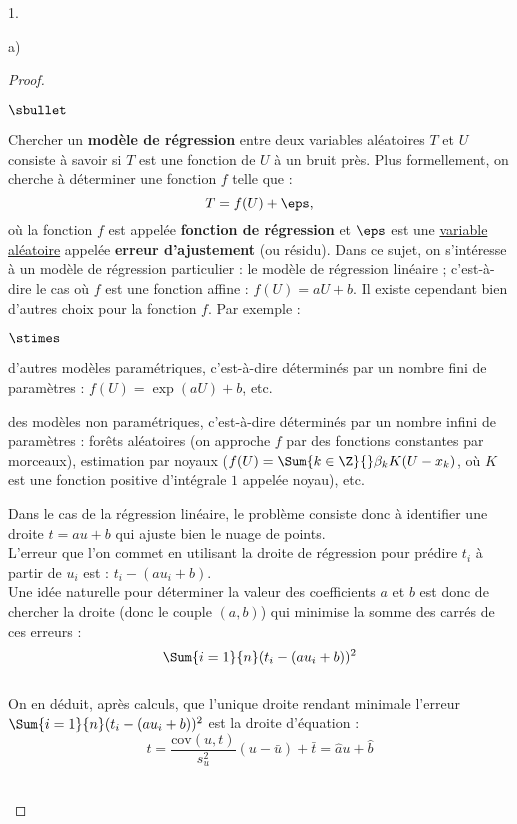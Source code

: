 \documentclass[11pt]{article}%
\begin{document}
\begin{noliste}{1.}
\begin{noliste}{a)}
\begin{proof}
   \begin{remark}
   \begin{noliste}{$\sbullet$}
    \item Chercher un {\bf modèle de régression} entre deux
    variables aléatoires $T$ et $U$ 
    consiste à savoir si $T$ est une fonction de $U$ à un bruit près. 
    Plus formellement, on cherche à
    déterminer une fonction $f$ telle que :
    \[
    T=f(U)+\eps,
    \]
    où la fonction $f$ est appelée {\bf fonction de régression} et
    $\eps$ est une \underline{variable aléatoire} appelée {\bf erreur
      d'ajustement} (ou résidu).
    Dans ce sujet, on s'intéresse à un modèle de régression particulier 
    : le modèle de régression linéaire ;
    c'est-à-dire le cas où $f$ est une fonction affine : $f(U)=aU+b$. Il
    existe cependant bien d'autres choix pour la fonction $f$. Par
    exemple :
    \begin{noliste}{$\stimes$}
    \item d'autres modèles paramétriques, c'est-à-dire déterminés par un
      nombre fini de paramètres : $f(U)=\exp(aU)+b$, etc.
    \item des modèles non paramétriques, c'est-à-dire déterminés par un
      nombre infini de paramètres : forêts aléatoires (on approche $f$
      par des fonctions constantes par morceaux), estimation par noyaux
      ($f(U)=\Sum{k\in\Z}{} \beta_k K(U-x_k)$, où $K$ est une fonction
      positive d'intégrale $1$ appelée noyau), etc.
    \end{noliste}
    
    \item Dans le cas de la régression linéaire, le problème 
    consiste donc à identifier une droite $t=au+b$ qui ajuste bien 
    le nuage de points.\\
    L'erreur que l'on commet en utilisant la droite de régression pour
    prédire $t_i$ à partir de $u_i$ est : $t_i - (au_i +b)$.\\
    Une idée naturelle pour déterminer la valeur des coefficients $a$ 
    et $b$ est donc de chercher la droite (donc le couple $(a,b)$)
    qui minimise la somme des carrés de ces erreurs :~\\[-.2cm]
    \[
     \Sum{i=1}{n} (t_i - (a u_i +b))^2
    \]~\\[-.4cm]
    On en déduit, après calculs, que l'unique droite rendant minimale
    l'erreur $\Sum{i=1}{n} (t_i - (a u_i +b))^2$ est la droite 
    d'équation :~\\[-.2cm]
    \[
     t = \dfrac{\text{cov}(u,t)}{s_u^2} (u- \bar{u}) + \bar{t}
     = \hat{a} u + \hat{b}
    \]
   \end{noliste}
   \end{remark}~\\[-1.4cm]
  \end{proof}
  

\end{noliste}
\end{noliste}
\end{document}
